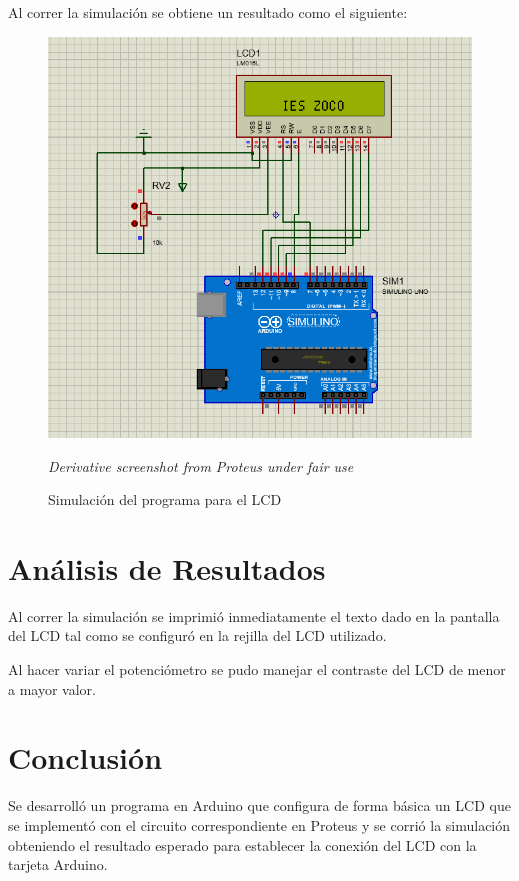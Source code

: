 \documentclass{article}
\begin{document}
    \bigbreak

    Al correr la simulación se obtiene un resultado como el siguiente:

    \begin{figure}[H]
        \centering
        \includegraphics[width=0.6\paperwidth]{images/sim-running}
        \caption{Simulación del programa para el LCD}\footnotesize
        \textit{Derivative screenshot from Proteus under fair use}
    \end{figure}

    \section{Análisis de Resultados}

    Al correr la simulación se imprimió inmediatamente el texto dado en la
    pantalla del LCD tal como se configuró en la rejilla del LCD utilizado.

    \bigbreak

    Al hacer variar el potenciómetro se pudo manejar el contraste del LCD de
    menor a mayor valor.

    \section{Conclusión}

    Se desarrolló un programa en Arduino que configura de forma básica un LCD
    que se implementó con el circuito correspondiente en Proteus y se corrió
    la simulación obteniendo el resultado esperado para establecer la
    conexión del LCD con la tarjeta Arduino.

    \printbibliography
\end{document}
